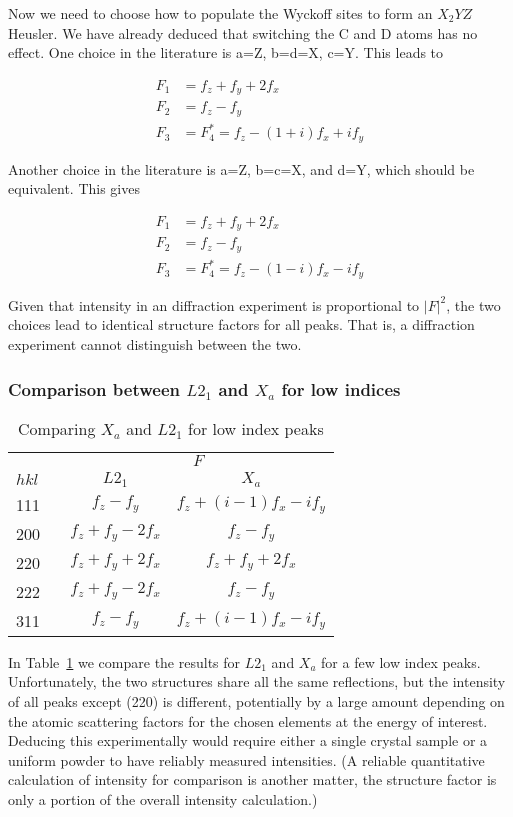 \documentclass[aps,amsmath,amssymb,prb,superscriptaddress,longtable,preprint,fleqn]{revtex4}
\begin{document}
Now we need to choose how to populate the Wyckoff sites to form an $X_2YZ$ Heusler. We have already deduced that switching the C and D atoms has no effect. One choice in the literature is a=Z, b=d=X, c=Y. This leads to

\begin{align}
F_1 &= f_z + f_y + 2f_x \\
F_2 &= f_z - f_y \\
F_3 &= F_4^* = f_z - (1+i)f_x + if_y
\end{align}

Another choice in the literature is a=Z, b=c=X, and d=Y, which should be equivalent. This gives

\begin{align}
F_1 &= f_z + f_y + 2f_x \\
F_2 &= f_z - f_y \\
F_3 &= F_4^* = f_z - (1-i)f_x - if_y
\end{align}

Given that intensity in an diffraction experiment is proportional to $|F|^2$, the two choices lead to identical structure factors for all peaks. That is, a diffraction experiment cannot distinguish between the two. 


\subsubsection{Comparison between $L2_1$ and $X_a$ for low indices}

\begin{table}[htdp]
\begin{center}
\caption{Comparing $X_a$ and $L2_1$ for low index peaks}
\begin{tabular}{lcc}
$\phantom{hkl}$& \multicolumn{2}{c}{$F$} \\\cline{2-3}
$hkl\quad$  & $L2_1$ & $X_a$\\
\hline
111 & $f_z - f_y$  & $f_z + (i-1)f_x - if_y$\\
200 & $f_z+ f_y - 2f_x$ & $f_z - f_y$ \\
220 & $f_z + f_y + 2f_x$ & $f_z + f_y + 2f_x$\\
222 & $f_z+ f_y - 2f_x$  & $f_z - f_y$ \\
311 & $f_z - f_y$ & $f_z + (i-1)f_x - if_y$
\label{compare.xa-l21}
\end{tabular}
\end{center}
\end{table}%

In Table~\ref{compare.xa-l21} we compare the results for $L2_1$ and $X_a$ for a few low index peaks. Unfortunately, the two structures share all the same reflections, but the intensity of all peaks except (220) is different, potentially by a large amount depending on the atomic scattering factors for the chosen elements at the energy of interest. Deducing this experimentally would require either a single crystal sample or a uniform powder to have reliably measured intensities. (A reliable quantitative calculation of intensity for comparison is another matter, the structure factor is only a portion of the overall intensity calculation.)
\end{document}
